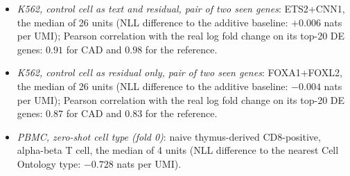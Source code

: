 \begin{itemize}
\item[(a)] \emph{K562, control cell as text and residual, pair of two seen genes}: ETS2+CNN1, the median of 26 units (NLL difference to the additive baseline: $+0.006$ nats per UMI); Pearson correlation with the real log fold change on its top-20 DE genes: $0.91$ for CAD and $0.98$ for the reference.
\item[(b)] \emph{K562, control cell as residual only, pair of two seen genes}: FOXA1+FOXL2, the median of 26 units (NLL difference to the additive baseline: $-0.004$ nats per UMI); Pearson correlation with the real log fold change on its top-20 DE genes: $0.87$ for CAD and $0.83$ for the reference.
\item[(c)] \emph{PBMC, zero-shot cell type (fold 0)}: naive thymus-derived CD8-positive, alpha-beta T cell, the median of 4 units (NLL difference to the nearest Cell Ontology type: $-0.728$ nats per UMI).
\end{itemize}
